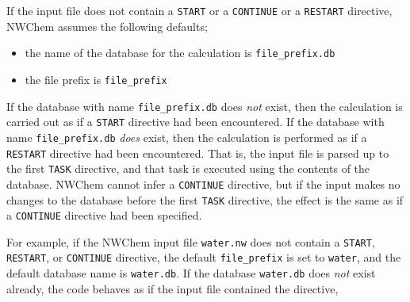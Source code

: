 

If the input file does not contain a \verb+START+ or a \verb+CONTINUE+ or a
\verb+RESTART+ directive, NWChem assumes the following defaults;

\begin{itemize}
  \item the name of the database for the calculation is {\tt file_prefix.db}
  \item the file prefix is {\tt file_prefix}
\end{itemize}

If the database 
with name {\tt file_prefix.db} does {\it not} exist, then the calculation 
is carried out as if a \verb+START+ directive had been encountered.  
If the database with name {\tt file_prefix.db} {\it does} exist, then 
the calculation
is performed as if a \verb+RESTART+ directive had been encountered.  That is,
the input file is parsed up to the first \verb+TASK+ directive, and that
task is executed using the contents of the database.  NWChem cannot infer
a \verb+CONTINUE+ directive, but if the input makes no changes to the 
database before the first \verb+TASK+ directive, the effect is the same as 
if a \verb+CONTINUE+ directive had been specified.


For example, if the NWChem input file \verb+water.nw+ does not contain
a \verb+START+, \verb+RESTART+, or \verb+CONTINUE+ directive, the default
{\tt file_prefix} is set to {\tt water}, and the default database name is
{\tt water.db}.  If the database \verb+water.db+ does {\it not} exist already,
the code behaves as if the input file contained the directive,


